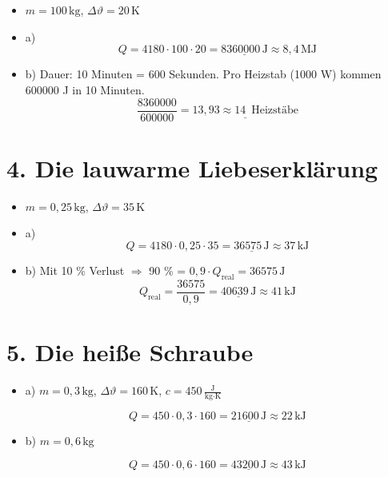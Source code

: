 \documentclass[a4paper]{article}
\begin{document}
\begin{itemize}
	\item \( m = 100\,\text{kg} \),  
	\( \Delta \vartheta = 20\,\text{K} \)
	
	\item a)  
	\[
	Q = 4180 \cdot 100 \cdot 20 = \underline{8360000\,\text{J}}\approx 8,4\, \text{MJ}
	\]
	
	\item b) Dauer: 10 Minuten = 600 Sekunden.  
	Pro Heizstab (1000 W) kommen 600000 J in 10 Minuten.  
	\[
	\frac{8360000}{600000} = \underline{13{,}93 \approx 14 \,\text{ Heizstäbe}}
	\]
\end{itemize}

\hrulefill

\section*{4. Die lauwarme Liebeserklärung}

\begin{itemize}
	\item \( m = 0{,}25\,\text{kg} \),  
	\( \Delta \vartheta = 35\,\text{K} \)
	
	\item a)  
	\[
	Q = 4180 \cdot 0{,}25 \cdot 35 = \underline{36575\,\text{J}}\approx 37 \,\text{kJ}
	\]
	\item b) Mit 10 \% Verlust $\Rightarrow$  90 \% = \( 0{,}9 \cdot Q_\text{real} = 36575\,\text{J} \)  
	\[
	Q_\text{real} = \frac{36575}{0{,}9} = \underline{40639\,\text{J}}\approx 41 \,\text{kJ}
	\]
\end{itemize}


\section*{5. Die heiße Schraube }

\begin{itemize}
	\item a) \( m = 0{,}3\,\text{kg} \), \( \Delta \vartheta = 160\,\text{K} \), \( c = 450 \,\frac{\text{J}}{\text{kg}\cdot\text{K}}\)
	
	\[
	Q = 450 \cdot 0{,}3 \cdot 160 = \underline{21600\,\text{J}}\approx 22 \,\text{kJ}
	\]
	
	\item b) \( m = 0{,}6\,\text{kg} \)
	
	\[
	Q = 450 \cdot 0{,}6 \cdot 160 = \underline{43200\,\text{J}}\approx 43\, \text{kJ}
	\]
\end{itemize}
\end{document}
